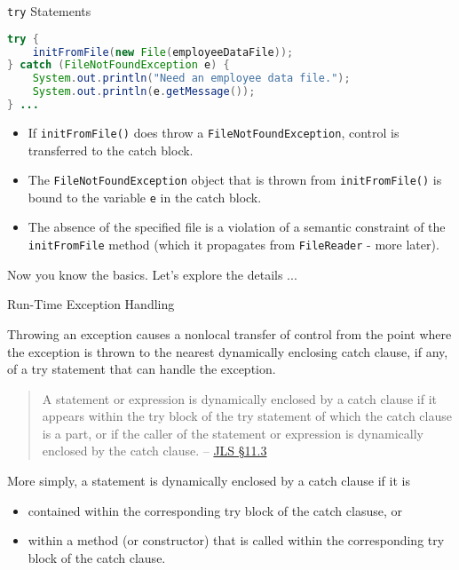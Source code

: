 \documentclass{beamer}
\begin{document}
\begin{frame}[fragile]{{\tt try} Statements}


\begin{lstlisting}[language=Java]
try {
    initFromFile(new File(employeeDataFile));
} catch (FileNotFoundException e) {
    System.out.println("Need an employee data file.");
    System.out.println(e.getMessage());
} ...
\end{lstlisting}

\begin{itemize}
\item If {\tt initFromFile()} does throw a {\tt FileNotFoundException}, control is transferred to the catch block.
\item The {\tt FileNotFoundException} object that is thrown from {\tt initFromFile()} is bound to the variable {\tt e} in the catch block.
\item The absence of the specified file is a violation of a semantic constraint of the {\tt initFromFile} method (which it propagates from {\tt FileReader} - more later).
\end{itemize}
Now you know the basics.  Let's explore the details ...

\end{frame}


\begin{frame}[fragile]{Run-Time Exception Handling}


Throwing an exception causes a nonlocal transfer of control from the point where the exception is thrown to the nearest dynamically enclosing catch clause, if any, of a try statement that can handle the exception.
\begin{quote}
A statement or expression is dynamically enclosed by a catch clause if it appears within the try block of the try statement of which the catch clause is a part, or if the caller of the statement or expression is dynamically enclosed by the catch clause. -- \href{http://docs.oracle.com/javase/specs/jls/se7/html/jls-11.html#jls-11.3}{JLS \S 11.3}
\end{quote}
More simply, a statement is dynamically enclosed by a catch clause if it is
\begin{itemize}
\item contained within the corresponding try block of the catch clasuse, or
\item  within a method (or constructor) that is called within the corresponding try block of the catch clause.
\end{itemize}

\end{frame}
\end{document}
